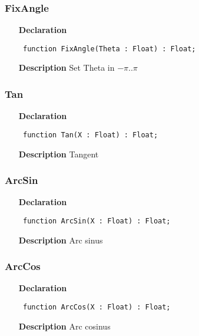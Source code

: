 \documentclass[12pt,a4paper,oneside]{report}
\newcommand{\declarationitem}[1]{\textbf{#1}}
\newcommand{\descriptiontitle}[1]{\textbf{#1}}
\newcommand{\code}[1]{\texttt{#1}}
\begin{document}
\subsubsection{FixAngle}
\label{utrigo-FixAngle}
\begin{itemize}\item[\declarationitem{Declaration}\hfill]
	\begin{flushleft}
		\code{
			function FixAngle(Theta : Float) : Float;}
		
	\end{flushleft}
	
	\par
	\item[\descriptiontitle{Description}]
	Set Theta in $-\pi..\pi$
	
\end{itemize}
\subsubsection{Tan}
\label{utrigo-Tan}
\begin{itemize}\item[\declarationitem{Declaration}\hfill]
	\begin{flushleft}
		\code{
			function Tan(X : Float) : Float;}
		
	\end{flushleft}
	
	\par
	\item[\descriptiontitle{Description}]
	Tangent
	
\end{itemize}
\subsubsection{ArcSin}
\label{utrigo-ArcSin}
\begin{itemize}\item[\declarationitem{Declaration}\hfill]
	\begin{flushleft}
		\code{
			function ArcSin(X : Float) : Float;}
		
	\end{flushleft}
	
	\par
	\item[\descriptiontitle{Description}]
	Arc sinus
	
\end{itemize}
\subsubsection{ArcCos}
\label{utrigo-ArcCos}
\begin{itemize}\item[\declarationitem{Declaration}\hfill]
	\begin{flushleft}
		\code{
			function ArcCos(X : Float) : Float;}
		
	\end{flushleft}
	
	\par
	\item[\descriptiontitle{Description}]
	Arc cosinus
	
\end{itemize}
\end{document}
